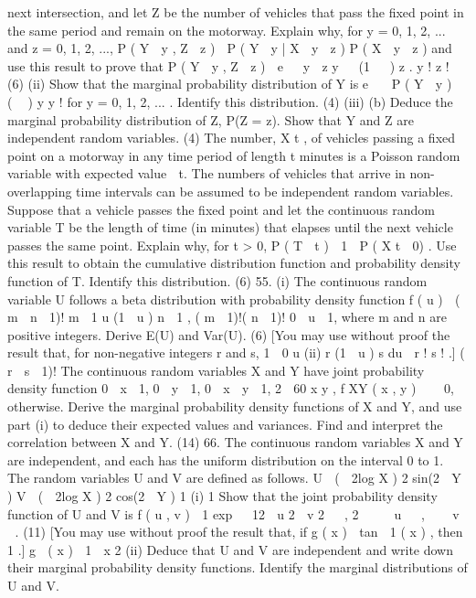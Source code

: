 next intersection, and let Z be the number of vehicles that pass the fixed
point in the same period and remain on the motorway. Explain why, for
y = 0, 1, 2, ... and z = 0, 1, 2, ...,
P ( Y  y , Z  z )  P ( Y  y | X  y  z ) P ( X  y  z )
and use this result to prove that
P ( Y  y , Z  z ) 
e   y  z y
  (1   ) z .
y ! z !
(6)
(ii)
Show that the marginal probability distribution of Y is
e  
P ( Y  y ) 
(  ) y
y !
for y = 0, 1, 2, ... . Identify this distribution.
(4)
(iii)
(b)
Deduce the marginal probability distribution of Z, P(Z = z). Show that
Y and Z are independent random variables.
(4)
The number, X t , of vehicles passing a fixed point on a motorway in any time
period of length t minutes is a Poisson random variable with expected value  t.
The numbers of vehicles that arrive in non-overlapping time intervals can be
assumed to be independent random variables.
Suppose that a vehicle passes the fixed point and let the continuous random
variable T be the length of time (in minutes) that elapses until the next vehicle
passes the same point. Explain why, for t > 0,
P ( T  t )  1  P ( X t  0) .
Use this result to obtain the cumulative distribution function and probability
density function of T. Identify this distribution.
(6)
55.
(i)
The continuous random variable U follows a beta distribution with probability
density function
f ( u ) 
( m  n  1)! m  1
u (1  u ) n  1 ,
( m  1)!( n  1)!
0  u  1,
where m and n are positive integers. Derive E(U) and Var(U).
(6)
[You may use without proof the result that, for non-negative integers r and s,
1
 0 u
(ii)
r
(1  u ) s du 
r ! s !
.]
( r  s  1)!
The continuous random variables X and Y have joint probability density
function
0  x  1, 0  y  1, 0  x  y  1,
2
 60 x y ,
f XY ( x , y )  
 0,
otherwise.
Derive the marginal probability density functions of X and Y, and use part (i) to
deduce their expected values and variances. Find and interpret the correlation
between X and Y.
(14)
66.
The continuous random variables X and Y are independent, and each has the uniform
distribution on the interval 0 to 1. The random variables U and V are defined as
follows.
U  (  2log X ) 2 sin(2  Y )
V  (  2log X ) 2 cos(2  Y )
1
(i)
1
Show that the joint probability density function of U and V is
f ( u , v ) 
1
exp   12  u 2  v 2   ,
2 
   u   ,    v   .
(11)
[You may use without proof the result that, if g ( x )  tan  1 ( x ) , then
1
.]
g  ( x ) 
1  x 2
(ii) Deduce that U and V are independent and write down their marginal
probability density functions. Identify the marginal distributions of U and V.
